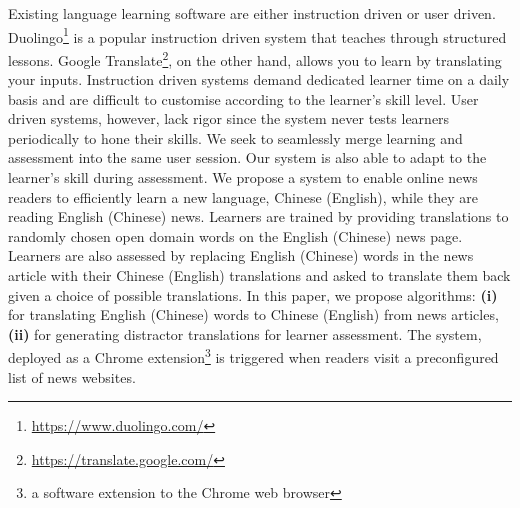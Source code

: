 Existing language learning software are either instruction driven or user driven. 
Duolingo\footnote{\url{https://www.duolingo.com/}} is a popular instruction driven system that teaches through structured lessons. Google Translate\footnote{\url{https://translate.google.com/}}, on the other hand, allows you to learn by translating your inputs. Instruction driven systems demand dedicated 
learner time on a daily basis and are difficult to customise according to the learner's skill level. User driven systems, however, lack rigor since the system never tests learners periodically to hone their skills. We seek to seamlessly merge learning and assessment into the same user session. %
Our system is also able to adapt to the learner's skill during assessment.
We propose a system to enable online news readers to efficiently learn 
a new language, Chinese (English), while they are reading English (Chinese) news. Learners are trained by providing translations to randomly chosen open domain words on the English (Chinese) news page. Learners are also assessed by replacing English (Chinese) words in the news article with their Chinese (English) translations and  asked to translate them back given a choice of possible translations. In this paper, 
we propose algorithms: \textbf{(i)} for translating English (Chinese) words to Chinese (English) from news articles, \textbf{(ii)} for generating distractor translations for learner assessment.
The system, deployed as a Chrome extension\footnote{a software extension to the Chrome web browser} is triggered when readers visit a preconfigured list of news websites.
